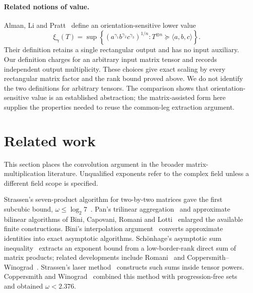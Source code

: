 \documentclass[11pt,letterpaper]{article}
\theoremstyle{definition}
\numberwithin{equation}{section}
\newcommand{\res}{\succeq}
\begin{document}
\paragraph{Related notions of value.}
Alman, Li and Pratt~\cite[Section 7]{ALP26} define an orientation-sensitive lower value
\begin{equation*}
 \xi_{\boldsymbol\gamma}(T)
 =\sup\left\{(a^{\gamma_1}b^{\gamma_2}c^{\gamma_3})^{1/n}:
 T^{\otimes n}\res\langle a,b,c\rangle\right\}.
\end{equation*}
Their definition retains a single rectangular output and has no input auxiliary. Our definition charges for an arbitrary input matrix tensor and records independent output multiplicity. These choices give exact scaling by every rectangular matrix factor and the rank bound proved above. We do not identify the two definitions for arbitrary tensors. The comparison shows that orientation-sensitive value is an established abstraction; the matrix-assisted form here supplies the properties needed to reuse the common-leg extraction argument.



\section{Related work}
\label{sec:related-work}

This section places the convolution argument in the broader matrix-multiplication literature. Unqualified exponents refer to the complex field unless a different field scope is specified.

Strassen's seven-product algorithm for two-by-two matrices gave the first subcubic bound, $\omega\leq\log_2 7$~\cite{Str69}. Pan's trilinear aggregation~\cite{Pan78} and approximate bilinear algorithms of Bini, Capovani, Romani and Lotti~\cite{BCLR79} enlarged the available finite constructions. Bini's interpolation argument~\cite{Bini80} converts approximate identities into exact asymptotic algorithms. Sch\"onhage's asymptotic sum inequality~\cite{Sch81} extracts an exponent bound from a low-border-rank direct sum of matrix products; related developments include Romani~\cite{Rom82} and Coppersmith--Winograd~\cite{CW82}. Strassen's laser method~\cite{Str86,Str87} constructs such sums inside tensor powers. Coppersmith and Winograd~\cite{CW90} combined this method with progression-free sets and obtained $\omega<2.376$.
\end{document}
